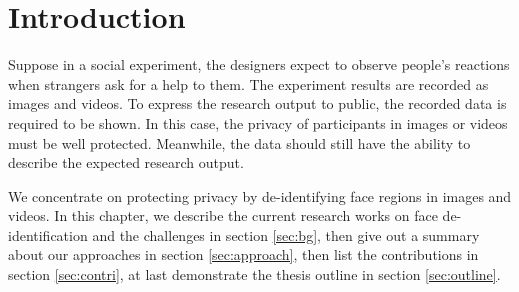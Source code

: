\iffalse

\fi

\chapter{Introduction}
\label{chap:intro}

Suppose in a social experiment, the designers expect to observe people's
reactions when strangers ask for a help to them. The experiment results are 
recorded as images and videos. To express the research output to public,
the recorded data is required to be shown. In this case, the privacy of 
participants in images or videos must be well protected. Meanwhile, the
data should still have the ability to describe the expected research output.

We concentrate on protecting privacy by de-identifying face regions in images and
videos. In this chapter, we describe the current research works on face 
de-identification and the challenges in section \ref{sec:bg}, then give out
a summary about our approaches in section \ref{sec:approach}, then list
the contributions in section \ref{sec:contri}, at last demonstrate the thesis
outline in section \ref{sec:outline}. 

